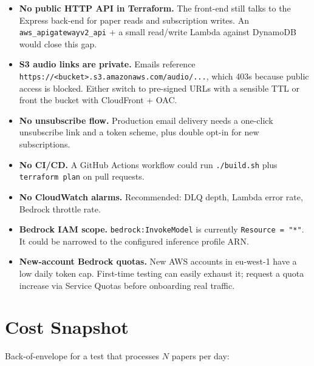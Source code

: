 \documentclass[11pt,a4paper]{article}
\begin{document}
\begin{itemize}[leftmargin=*]
  \item \textbf{No public HTTP API in Terraform.} The front-end still talks to the Express back-end for paper reads and subscription writes. An \texttt{aws\_apigatewayv2\_api} + a small read/write Lambda against DynamoDB would close this gap.
  \item \textbf{S3 audio links are private.} Emails reference \texttt{https://<bucket>.s3.amazonaws.com/audio/...}, which 403s because public access is blocked. Either switch to pre-signed URLs with a sensible TTL or front the bucket with CloudFront + OAC.
  \item \textbf{No unsubscribe flow.} Production email delivery needs a one-click unsubscribe link and a token scheme, plus double opt-in for new subscriptions.
  \item \textbf{No CI/CD.} A GitHub Actions workflow could run \texttt{./build.sh} plus \texttt{terraform plan} on pull requests.
  \item \textbf{No CloudWatch alarms.} Recommended: DLQ depth, Lambda error rate, Bedrock throttle rate.
  \item \textbf{Bedrock IAM scope.} \texttt{bedrock:InvokeModel} is currently \texttt{Resource = "*"}. It could be narrowed to the configured inference profile ARN.
  \item \textbf{New-account Bedrock quotas.} New AWS accounts in eu-west-1 have a low daily token cap. First-time testing can easily exhaust it; request a quota increase via Service Quotas before onboarding real traffic.
\end{itemize}

\section{Cost Snapshot}

Back-of-envelope for a test that processes $N$ papers per day:
\end{document}
